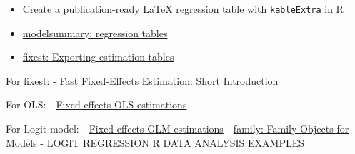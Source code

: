 \documentclass[
]{article}
\begin{document}
\begin{itemize}
\item
  \href{https://tilburgsciencehub.com/topics/visualization/reporting-tables/reportingtables/kableextra/}{Create
  a publication-ready LaTeX regression table with \texttt{kableExtra} in
  R}
\item
  \href{https://modelsummary.com/articles/modelsummary.html}{modelsummary:
  regression tables}
\item
  \href{https://lrberge.github.io/fixest/articles/exporting_tables.html\#exporting-multiple-estimations-to-latex}{fixest:
  Exporting estimation tables}
\end{itemize}

For fixest: -
\href{https://cran.r-project.org/web/packages/fixest/vignettes/fixest_walkthrough.html}{Fast
Fixed-Effects Estimation: Short Introduction}

For OLS: -
\href{https://lrberge.github.io/fixest/reference/feols.html}{Fixed-effects
OLS estimations}

For Logit model: -
\href{https://lrberge.github.io/fixest/reference/feglm.html}{Fixed-effects
GLM estimations} - \href{https://rdrr.io/r/stats/family.html}{family:
Family Objects for Models} -
\href{https://stats.oarc.ucla.edu/r/dae/logit-regression/}{LOGIT
REGRESSION \textbar{} R DATA ANALYSIS EXAMPLES}
\end{document}
